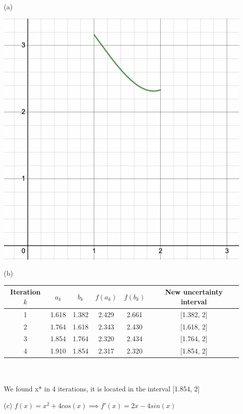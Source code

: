 \documentclass[12pt]{article}
\begin{document}
\begin{itemize}
    \item[(a)] 
        \begin{minipage}{0.6\textwidth}
        \end{minipage}
        \begin{minipage}{0.4\textwidth}
            \centering
            \includegraphics[width=\textwidth]{1a.png} 
        \end{minipage}
    \item[(b)] 
    \begin{tabular}{|c|c|c|c|c|c|}
        \hline
        Iteration $k$ & $a_k$ & $b_k$ & $f(a_k)$ & $f(b_k)$ & New uncertainty interval \\
        \hline
        1 & 1.618 & 1.382 & 2.429 & 2.661 & [1.382, 2] \\
        2 & 1.764 & 1.618 & 2.343 & 2.430 & [1.618, 2] \\
        3 & 1.854 & 1.764 & 2.320 & 2.434 & [1.764, 2] \\
        4 & 1.910 & 1.854 & 2.317 & 2.320 & [1.854, 2] \\
        \hline
    \end{tabular} \\ \\ 
    We found x* in 4 iterations, it is located in the interval [1.854, 2] 
    \item[(c)]
    $f(x) = x^{2} + 4cos(x) \implies f'(x) = 2x - 4sin(x)$  \\


\end{itemize}
\end{document}
